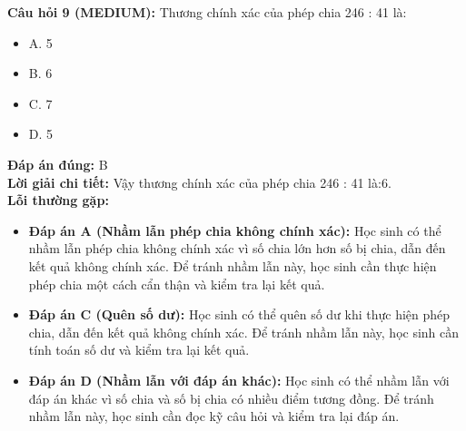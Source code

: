 \documentclass{article}
\begin{document}
\begin{minipage}{\textwidth}
\noindent\textbf{Câu hỏi 9 (MEDIUM):} Thương chính xác của phép chia 246 : 41 là: 
\begin{itemize}[label={}]
    \item A. 5
    \item B. 6
    \item C. 7
    \item D. 5
\end{itemize}
\textbf{Đáp án đúng:} B \\
\textbf{Lời giải chi tiết:} Vậy thương chính xác của phép chia 246 : 41 là:6. \\
\textbf{Lỗi thường gặp:}
\begin{itemize}
  \item \textbf{Đáp án A (Nhầm lẫn phép chia không chính xác):} Học sinh có thể nhầm lẫn phép chia không chính xác vì số chia lớn hơn số bị chia, dẫn đến kết quả không chính xác. Để tránh nhầm lẫn này, học sinh cần thực hiện phép chia một cách cẩn thận và kiểm tra lại kết quả.
  \item \textbf{Đáp án C (Quên số dư):} Học sinh có thể quên số dư khi thực hiện phép chia, dẫn đến kết quả không chính xác. Để tránh nhầm lẫn này, học sinh cần tính toán số dư và kiểm tra lại kết quả.
  \item \textbf{Đáp án D (Nhầm lẫn với đáp án khác):} Học sinh có thể nhầm lẫn với đáp án khác vì số chia và số bị chia có nhiều điểm tương đồng. Để tránh nhầm lẫn này, học sinh cần đọc kỹ câu hỏi và kiểm tra lại đáp án.
\end{itemize}
\end{minipage}
\vspace{1em}
\end{document}
